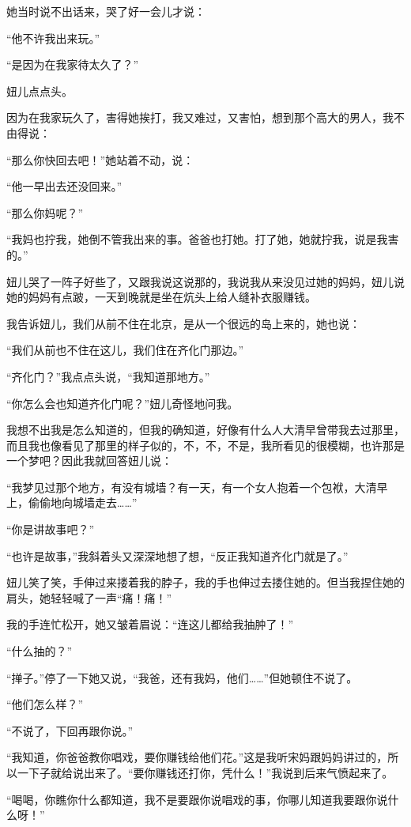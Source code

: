 \par 她当时说不出话来，哭了好一会儿才说：
\par “他不许我出来玩。”
\par “是因为在我家待太久了？”
\par 妞儿点点头。
\par 因为在我家玩久了，害得她挨打，我又难过，又害怕，想到那个高大的男人，我不由得说：
\par “那么你快回去吧！”她站着不动，说：
\par “他一早出去还没回来。”
\par “那么你妈呢？”
\par “我妈也拧我，她倒不管我出来的事。爸爸也打她。打了她，她就拧我，说是我害的。”
\par 妞儿哭了一阵子好些了，又跟我说这说那的，我说我从来没见过她的妈妈，妞儿说她的妈妈有点跛，一天到晚就是坐在炕头上给人缝补衣服赚钱。
\par 我告诉妞儿，我们从前不住在北京，是从一个很远的岛上来的，她也说：
\par “我们从前也不住在这儿，我们住在齐化门那边。”
\par “齐化门？”我点点头说，“我知道那地方。”
\par “你怎么会也知道齐化门呢？”妞儿奇怪地问我。
\par 我想不出我是怎么知道的，但我的确知道，好像有什么人大清早曾带我去过那里，而且我也像看见了那里的样子似的，不，不，不是，我所看见的很模糊，也许那是一个梦吧？因此我就回答妞儿说：
\par “我梦见过那个地方，有没有城墙？有一天，有一个女人抱着一个包袱，大清早上，偷偷地向城墙走去……”
\par “你是讲故事吧？”
\par “也许是故事，”我斜着头又深深地想了想，“反正我知道齐化门就是了。”
\par 妞儿笑了笑，手伸过来搂着我的脖子，我的手也伸过去搂住她的。但当我捏住她的肩头，她轻轻喊了一声“痛！痛！”
\par 我的手连忙松开，她又皱着眉说：“连这儿都给我抽肿了！”
\par “什么抽的？”
\par “掸子。”停了一下她又说，“我爸，还有我妈，他们……”但她顿住不说了。
\par “他们怎么样？”
\par “不说了，下回再跟你说。”
\par “我知道，你爸爸教你唱戏，要你赚钱给他们花。”这是我听宋妈跟妈妈讲过的，所以一下子就给说出来了。“要你赚钱还打你，凭什么！”我说到后来气愤起来了。
\par “喝喝，你瞧你什么都知道，我不是要跟你说唱戏的事，你哪儿知道我要跟你说什么呀！”
